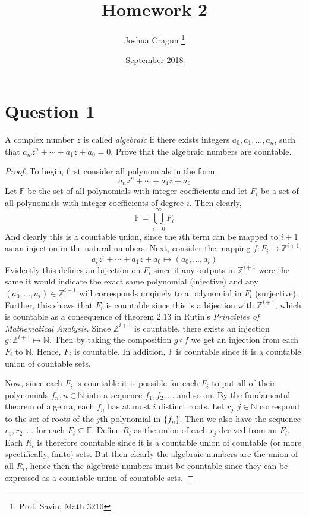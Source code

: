 \documentclass[12pt, letterpaper]{article}
\title{Homework 2}
\author{Joshua Cragun \thanks{Prof. Savin, Math 3210}}
\date{September 2018}
\begin{document}
\begin{titlepage}
\maketitle
\end{titlepage}

\section*{Question 1}
A complex number $z$ is called \textit{algebraic} if there exists integers $a_0, a_1, ..., a_n$,
such that $a_n z^n + \cdots + a_1 z + a_0 = 0$. Prove that the algebraic numbers are countable.

\begin{proof}
  To begin, first consider all polynomials in the form
  $$a_n z^n + \cdots + a_1 z + a_0$$
  Let $\mathbb{F}$ be the set of all polynomials with integer coefficients and let $F_i$ be a set of all polynomials with integer coefficients of degree $i$. Then clearly,
  $$ \mathbb{F} = \bigcup\limits_{i = 0}^{\infty} F_i$$
  And clearly this is a countable union, since the $i$th term can be mapped to $i + 1$ as an injection in the natural numbers. Next, consider the mapping $f: F_i \mapsto \mathbb{Z}^{i+1}$:
  $$ a_i z^i + \cdots + a_1 z + a_0 \mapsto (a_0, ..., a_i)$$
  Evidently this defines an bijection on $F_i$ since if any outputs in $\mathbb{Z}^{i+1}$ were the same it would indicate the exact same polynomial (injective)
  and any $(a_0, ..., a_i) \in \mathbb{Z}^{i+1}$ will corresponds unqiuely to a polynomial in $F_i$ (surjective). Further, this shows that $F_i$ is countable
  since this is a bijection with $\mathbb{Z}^{i+1}$, which is countable as a consequence of theorem 2.13 in Rutin's \textit{Principles of Mathematical Analysis}.
  Since $\mathbb{Z}^{i+1}$ is countable, there exists an injection $g : \mathbb{Z}^{i+1} \mapsto \mathbb{N}$.
  Then by taking the composition $g \circ f$ we get an injection from each $F_i$ to $\mathbb{N}$. Hence, $F_i$ is countable.
  In addition, $\mathbb{F}$ is countable since it is a countable union of countable sets.

  Now, since each $F_i$ is countable it is possible for each $F_i$ to put all of their polynomials $f_n, n \in \mathbb{N}$ into a sequence $f_1, f_2, ...$ and so on.
  By the fundamental theorem of algebra, each $f_n$ has at most $i$ distinct roots. Let $r_j, j \in \mathbb{N}$ correspond to the set of roots of the $j$th polynomial in $\{f_n\}$.
  Then we also have the sequence $r_1, r_2, ...$ for each $F_i \subseteq \mathbb{F}$. Define $R_i$ as the union of each $r_j$ derived from an $F_i$. Each $R_i$ is therefore
  countable since it is a countable union of countable (or more spectifically, finite) sets. But then clearly the algebraic numbers are the union of all $R_i$, hence then
  the algebraic numbers must be countable since they can be expressed as a countable union of countable sets.

\end{proof}
\end{document}
